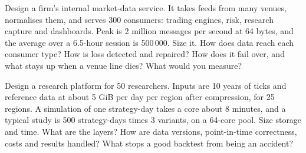 \begin{question}\label{iq:iv3:system-design:39}
Design a firm's internal market-data service. It takes feeds from many venues, normalises them, and serves 300 consumers: trading engines, risk, research capture and dashboards. Peak is 2 million messages per second at 64 bytes, and the average over a 6.5-hour session is 500\,000. Size it. How does data reach each consumer type? How is loss detected and repaired? How does it fail over, and what stays up when a venue line dies? What would you measure?
\end{question}

\begin{question}\label{iq:iv3:system-design:40}
Design a research platform for 50 researchers. Inputs are 10 years of ticks and reference data at about 5 GiB per day per region after compression, for 25 regions. A simulation of one strategy-day takes a core about 8 minutes, and a typical study is 500 strategy-days times 3 variants, on a 64-core pool. Size storage and time. What are the layers? How are data versions, point-in-time correctness, costs and results handled? What stops a good backtest from being an accident?
\end{question}
